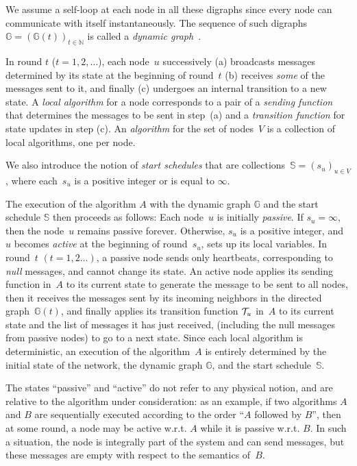 \documentclass[11pt,letterpaper]{article}
\begin{document}
We assume a self-loop at each node in all these digraphs  since every node can communicate with 
	itself instantaneously.	
The sequence of such digraphs~$\mathds{G}=\left (\mathds{G}(t) \right )_{t\in \mathds{N}}$ is called a {\em dynamic graph}~\cite{CFQS11:TVG}. 

In round $t$ ($t = 1, 2 , \ldots $), each node~$ u $ successively
	(a) broadcasts  messages determined by its state at the beginning of round~$ t $
	(b) receives \emph{some} of the messages sent to it,
	and finally (c) undergoes an internal transition to a new state.
A  \emph{local algorithm} for a node corresponds to a pair of
	a \emph{sending function} that determines the messages to be sent in step~(a)
	and a \emph{transition function} for state updates in step (c).
An \emph{algorithm} for the set of nodes~$V$ is a collection of local algorithms, one per node.

We also introduce the notion of  \emph{start schedules}
	that are collections~$\mathds{S}= \left (s_u \right )_{u \in V}$,
	where each~$s_u$ is  a positive integer or is equal to $\infty$.

	
The execution of the algorithm $ A $  with the dynamic graph $\mathds{G}$ and the start schedule $\mathds{S}$ then proceeds
	as follows:
Each node~$u$ is initially  \emph{passive}. 
If $s_u = \infty$, then  the node~$u$ remains passive forever.
Otherwise, $s_u $ is a positive integer, and $u$ becomes {\em active} 
	at the beginning of round~$s_u$, sets up its local variables.
In  round~$t$ $(t = 1,2\dots)$, a passive  node
	sends only heartbeats, corresponding to  \emph{null} messages,  and  cannot change its state. 	
An active node 	applies its sending function in~$A$ to its current state to generate the message to be sent to all nodes,
	then it receives the messages sent by its incoming neighbors in the directed graph~$\mathds{G}(t)$, and finally 
	applies its transition function ${\cal T}_u$ in~$A$ to its current state and the list of messages it has just received,
	(including the null messages from passive nodes) to go to  a next state. 
Since each local algorithm is deterministic, an execution of the algorithm~$A$  is entirely determined 
	by the initial state of the network,  the dynamic graph $\mathds{G}$,
	and  the  start schedule~$\mathds{S}$.
	
The states ``passive'' and ``active'' do not refer to any physical notion, and are relative to the algorithm under consideration:
	as an example, if two algorithms $A$ and $B$ are sequentially executed according to the order ``$A$ followed by $B$'',
	then at some round, a node may be active w.r.t. $A$ while it is passive w.r.t. $B$.
In such a situation, the node  is integrally part of the system and can send messages, but  these messages are empty 
	with respect to the semantics of~$B$.
	
\end{document}
